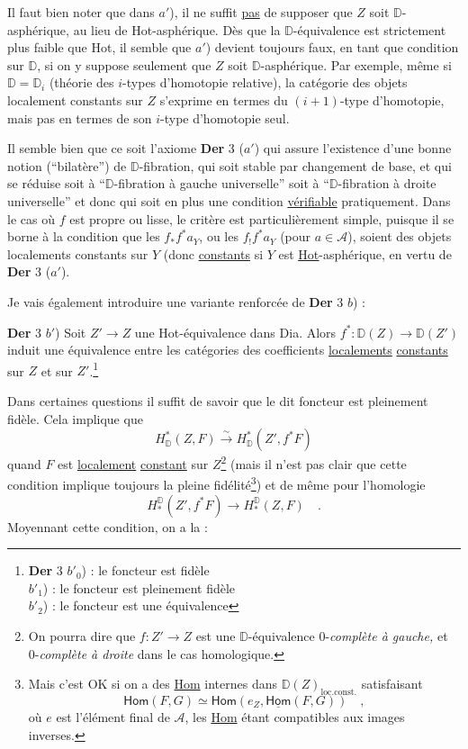 \documentclass[11pt]{article}
\newcommand{\printedpage}[1]{\marginpar{\footnotesize p.~#1}}
\newcommand{\msp}[1]{\marginpar{\footnotesize [#1]}}
\newcommand{\Hot}{\textsf{Hot}}
\newcommand{\Dia}{\textsf{Dia}}
\newcommand{\Hom}{\textsf{Hom}}
\newcommand{\DD}{\mathbb{D}}
\begin{document}
Il faut bien noter que dans $a'$), il ne suffit \underline{pas} de supposer que $Z$ soit $\DD$-asphérique, au lieu de \Hot-asphérique. Dès que la $\DD$-équivalence est strictement plus faible que \Hot, il semble que $a'$) devient toujours faux, en tant que condition sur $\DD$, si on y suppose seulement que $Z$ soit $\DD$-asphérique. Par exemple, même si $\DD = \DD_i$ (théorie des $i$-types d’homotopie relative), la catégorie
\msp{page 98}
des objets localement constants sur $Z$ s’exprime en termes du $(i+1)$-type d’homotopie, mais pas en termes de son $i$-type d’homotopie seul.

Il semble bien que ce soit l’axiome \textbf{Der} 3 ($a'$) qui assure l’existence d’une bonne notion (“bilatère”) de $\DD$-fibration, qui soit stable par changement de base, et qui se réduise soit
\printedpage{60}
à “$\DD$-fibration à gauche universelle” soit à “$\DD$-fibration à droite universelle” et donc qui soit en plus une condition \underline{vérifiable} pratiquement. Dans le cas où $f$ est propre ou lisse, le critère est particulièrement simple, puisque il se borne à la condition que les $f_* f^* a_Y$, ou les $f_! f^* a_Y$ (pour $a \in \mathcal{A}$), soient des objets localements constants sur $Y$ (donc \underline{constants} si $Y$ est \underline{\underline{\Hot}}-asphérique, en vertu de \textbf{Der} 3 ($a'$). %

Je vais également introduire une variante renforcée de \textbf{Der} 3 $b$) :

\textbf{Der} 3 $b'$) Soit $Z' \to Z$ une \Hot-équivalence dans \Dia. Alors $f^* : \DD(Z) \to \DD(Z')$ induit une équivalence entre les catégories des coefficients \underline{localements} \underline{constants} sur $Z$ et sur $Z'$.\footnote[50]{\textbf{Der} 3 $b'_0$) : le foncteur est fidèle\\
\hspace*{6em}$b'_1$) : le foncteur est pleinement fidèle\\
\hspace*{6em}$b'_2$) : le foncteur est une équivalence} %

\msp{page 99}
Dans certaines questions il suffit de savoir que le dit foncteur est pleinement fidèle. Cela implique que
\[
H^*_{\DD}(Z,F) \overset{\sim}{\longrightarrow} H^*_{\DD}(Z', f^*F)
\]
quand $F$ est \underline{localement} \underline{constant} sur $Z$\footnote[51]{On pourra dire que $f : Z' \to Z$ est une $\DD$-équivalence 0-\textit{complète à gauche,} et 0-\textit{complète à droite} dans le cas homologique.} (mais il n’est pas clair que cette condition implique toujours la pleine fidélité\footnote[52]{Mais c’est OK si on a des \underline{\Hom} internes dans $\DD(Z)_{\mathrm{loc.const.}}$ satisfaisant
\[
\Hom(F,G) \simeq \Hom(e_Z, \underline{\Hom}(F,G)) \quad ,
\]
où $e$ est l’élément final de $\mathcal{A}$, les \underline{\Hom} étant compatibles aux images inverses.}) et de même pour l’homologie
\[
H_*^{\DD}(Z', f^*F) \longrightarrow H_*^{\DD}(Z,F) \quad .
\]
Moyennant cette condition, on a la :
\end{document}
